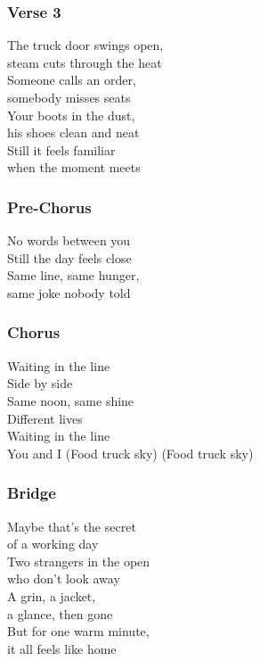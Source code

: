 \subsubsection{Verse 3}\label{verse-3-1}

The truck door swings open,\\
steam cuts through the heat\\
Someone calls an order,\\
somebody misses seats\\
Your boots in the dust,\\
his shoes clean and neat\\
Still it feels familiar\\
when the moment meets

\subsubsection{Pre-Chorus}\label{pre-chorus-1}

No words between you\\
Still the day feels close\\
Same line, same hunger,\\
same joke nobody told

\subsubsection{Chorus}\label{chorus-8}

Waiting in the line\\
Side by side\\
Same noon, same shine\\
Different lives\\
Waiting in the line\\
You and I (Food truck sky) (Food truck sky)

\subsubsection{Bridge}\label{bridge-1}

Maybe that's the secret\\
of a working day\\
Two strangers in the open\\
who don't look away\\
A grin, a jacket,\\
a glance, then gone\\
But for one warm minute,\\
it all feels like home

